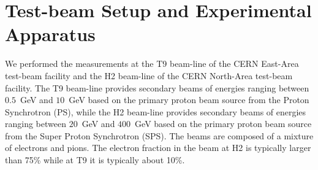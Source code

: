 \section{Test-beam Setup and Experimental Apparatus }
\label{sec:tbeam}

We performed the measurements at the T9 beam-line of the CERN East-Area test-beam facility and 
the H2 beam-line of the CERN North-Area test-beam facility. The T9 beam-line provides secondary 
beams of energies ranging between $0.5$~GeV and $10$~GeV based on the primary proton beam source 
from the Proton Synchrotron (PS), while the H2 beam-line provides secondary beams of energies 
ranging between $20$~GeV and $400$~GeV based on the primary proton beam source from the Super 
Proton Synchrotron (SPS). The beams are composed of 
a mixture of electrons and pions. The electron fraction in the beam at H2 is typically larger than 75\%
while at T9 it is typically about 10\%. 

